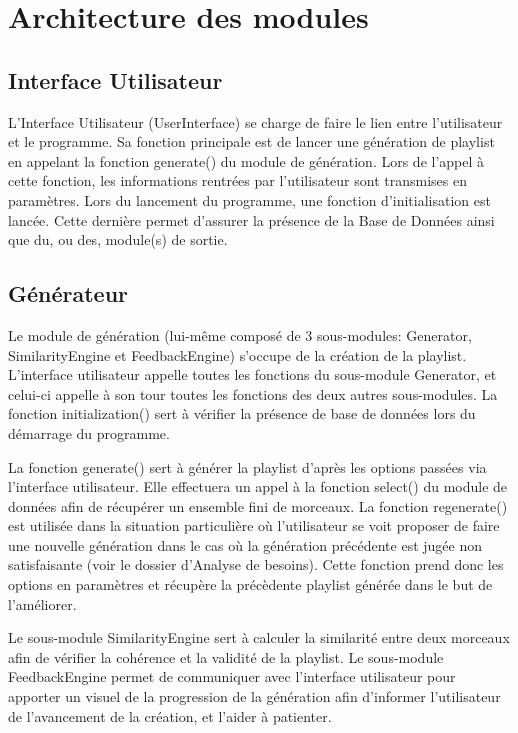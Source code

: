 
\section{Architecture des modules}
\label{archi:modules}

\subsection{Interface Utilisateur}
\label{archi:modules:iu}

L'Interface Utilisateur (UserInterface) se charge de faire le lien entre
l'utilisateur et le programme. Sa fonction principale est de lancer une
génération de playlist en appelant la fonction generate() du module de 
génération. Lors de l'appel à cette fonction, les informations rentrées par 
l'utilisateur sont transmises en paramètres. Lors du lancement du programme,
 une fonction d'initialisation est lancée. Cette dernière permet d'assurer 
 la présence de la Base de Données ainsi que du, ou des, module(s) de sortie.

\subsection{Générateur}
\label{archi:modules:generateur}

Le module de génération (lui-même composé de 3 sous-modules: Generator, 
SimilarityEngine et FeedbackEngine) s'occupe de la création de la playlist. 
L'interface utilisateur appelle toutes les fonctions du sous-module 
Generator, et celui-ci appelle à son tour toutes les fonctions des deux 
autres sous-modules. La fonction initialization() sert à vérifier la 
présence de base de données lors du démarrage du programme. 

La fonction generate() sert à générer la playlist d'après les options 
passées via l'interface utilisateur. Elle effectuera un appel à la fonction 
select() du module de données afin de récupérer un ensemble fini de morceaux.
 La fonction regenerate() est utilisée dans la situation particulière où 
 l'utilisateur se voit proposer de faire une nouvelle génération dans le cas 
 où la génération précédente est jugée non satisfaisante (voir le dossier 
 d'Analyse de besoins). Cette fonction prend donc les options en paramètres 
 et récupère la précèdente playlist générée dans le but de l'améliorer.

Le sous-module SimilarityEngine sert à calculer la similarité entre deux 
morceaux afin de vérifier la cohérence et la validité de la playlist. Le 
sous-module FeedbackEngine permet de communiquer avec l'interface 
utilisateur pour apporter un visuel de la progression de la génération afin 
d'informer l'utilisateur de l'avancement de la création, et l'aider à 
patienter.

